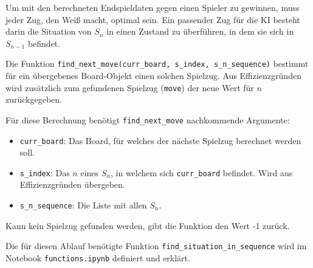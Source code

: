 \documentclass[a4paper,12pt]{article}
\begin{document}
Um mit den berechneten Endspieldaten gegen einen Spieler zu gewinnen,
muss jeder Zug, den Weiß macht, optimal sein. Ein passender Zug für die
KI besteht darin die Situation von \(S_n\) in einen Zustand zu
überführen, in dem sie sich in \(S_{n-1}\) befindet.

Die Funktion
\texttt{find\_next\_move(curr\_board,\ s\_index,\ s\_n\_sequence)}
bestimmt für ein übergebenes Board-Objekt einen solchen Spielzug. Aus
Effizienzgründen wird zusätzlich zum gefundenen Spielzug (\texttt{move})
der neue Wert für \(n\) zurückgegeben.

Für diese Berechnung benötigt \texttt{find\_next\_move} nachkommende
Argumente:
\begin{itemize}
	\item \texttt{curr\_board}: Das Board, für welches der nächste
	Spielzug berechnet werden soll. 
	\item \texttt{s\_index}: Das \(n\) eines
	\(S_n\), in welchem sich \texttt{curr\_board} befindet. Wird aus
	Effizienzgründen übergeben.
	\item \texttt{s\_n\_sequence}: Die Liste mit
	allen \(S_n\).
\end{itemize}

Kann kein Spielzug gefunden werden, gibt die Funktion den Wert -1
zurück.

Die für diesen Ablauf benötigte Funktion
\texttt{find\_situation\_in\_sequence} wird im Notebook
\texttt{functions.ipynb} definiert und erklärt.
\end{document}
